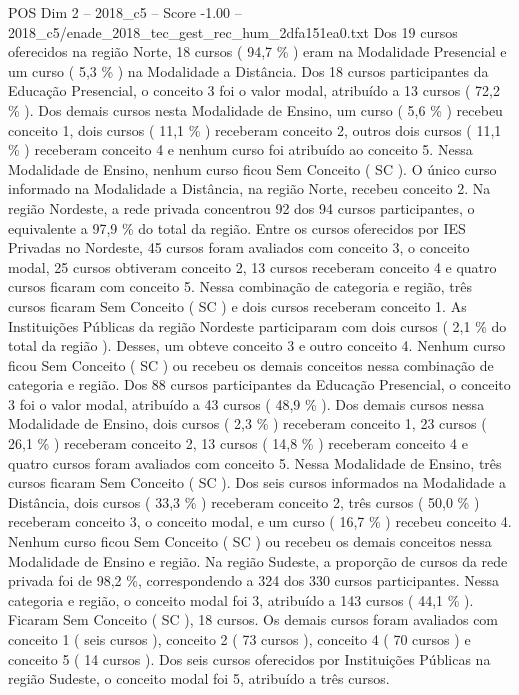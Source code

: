 \begin{textsample}{POS Dim 2 – 2018\_c5 – Score -1.00 – 2018\_c5/enade\_2018\_tec\_gest\_rec\_hum\_2dfa151ea0.txt}
Dos 19 cursos oferecidos na região Norte, 18 cursos ( 94,7 \% ) eram na Modalidade Presencial e um curso ( 5,3 \% ) na Modalidade a Distância.
Dos 18 cursos participantes da Educação Presencial, o conceito 3 foi o valor modal, atribuído a 13 cursos ( 72,2 \% ).
Dos demais cursos nesta Modalidade de Ensino, um curso ( 5,6 \% ) recebeu conceito 1, dois cursos ( 11,1 \% ) receberam conceito 2, outros dois cursos ( 11,1 \% ) receberam conceito 4 e nenhum curso foi atribuído ao conceito 5.
Nessa Modalidade de Ensino, nenhum curso ficou Sem Conceito ( SC ).
O único curso informado na Modalidade a Distância, na região Norte, recebeu conceito 2.
Na região Nordeste, a rede privada concentrou 92 dos 94 cursos participantes, o equivalente a 97,9 \% do total da região.
Entre os cursos oferecidos por IES Privadas no Nordeste, 45 cursos foram avaliados com conceito 3, o conceito modal, 25 cursos obtiveram conceito 2, 13 cursos receberam conceito 4 e quatro cursos ficaram com conceito 5.
Nessa combinação de categoria e região, três cursos ficaram Sem Conceito ( SC ) e dois cursos receberam conceito 1.
As Instituições Públicas da região Nordeste participaram com dois cursos ( 2,1 \% do total da região ).
Desses, um obteve conceito 3 e outro conceito 4.
Nenhum curso ficou Sem Conceito ( SC ) ou recebeu os demais conceitos nessa combinação de categoria e região.
Dos 88 cursos participantes da Educação Presencial, o conceito 3 foi o valor modal, atribuído a 43 cursos ( 48,9 \% ).
Dos demais cursos nessa Modalidade de Ensino, dois cursos ( 2,3 \% ) receberam conceito 1, 23 cursos ( 26,1 \% ) receberam conceito 2, 13 cursos ( 14,8 \% ) receberam conceito 4 e quatro cursos foram avaliados com conceito 5.
Nessa Modalidade de Ensino, três cursos ficaram Sem Conceito ( SC ).
Dos seis cursos informados na Modalidade a Distância, dois cursos ( 33,3 \% ) receberam conceito 2, três cursos ( 50,0 \% ) receberam conceito 3, o conceito modal, e um curso ( 16,7 \% ) recebeu conceito 4.
Nenhum curso ficou Sem Conceito ( SC ) ou recebeu os demais conceitos nessa Modalidade de Ensino e região.
Na região Sudeste, a proporção de cursos da rede privada foi de 98,2 \%, correspondendo a 324 dos 330 cursos participantes.
Nessa categoria e região, o conceito modal foi 3, atribuído a 143 cursos ( 44,1 \% ).
Ficaram Sem Conceito ( SC ), 18 cursos.
Os demais cursos foram avaliados com conceito 1 ( seis cursos ), conceito 2 ( 73 cursos ), conceito 4 ( 70 cursos ) e conceito 5 ( 14 cursos ).
Dos seis cursos oferecidos por Instituições Públicas na região Sudeste, o conceito modal foi 5, atribuído a três cursos.

\end{textsample}
